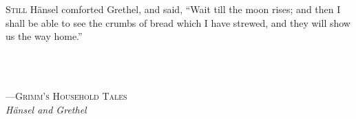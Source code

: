 \documentclass[11pt,a4paper,twoside]{book}
\begin{document}
\thispagestyle{empty}
\vspace*{2cm}


\begin{comment}
\begin{minipage}{0.57\textwidth}
\Large
{
	\lettrine[lines=2,lhang=0.9,nindent=0.35em]{``H}{\"ansel}, however, little by little, threw all the crumbs on the path.
}''\\ \ \\
\end{minipage}
\end{comment}


\begin{minipage}{0.8\textwidth}
\Large
	\lettrine[lines=2, loversize=0.35, lhang=0.5]{S}{till} 
	H\"ansel comforted Grethel, and said, ``Wait till the moon
	rises; and then I shall be able to see the crumbs of bread which I
	have strewed, and they will show us the way home.''
\end{minipage}
\\ \ \\


\begin{minipage}{0.8\textwidth}
\begin{flushright}

---\textsc{Grimm's Household Tales}\\

\textit{H\"ansel and Grethel}

\end{flushright}
\end{minipage}
\end{document}
